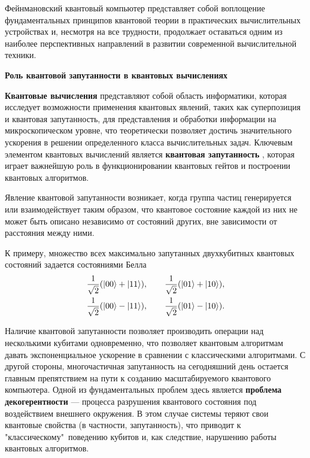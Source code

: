 Фейнмановский квантовый компьютер представляет собой воплощение фундаментальных принципов квантовой теории в практических вычислитель­ных устройствах и, несмотря на все трудности, продолжает оставаться одним из наиболее перспективных направлений в развитии современной вычислитель­ной техники.

\clearpage
\indent\textbf{Роль квантовой запутанности в квантовых вычислениях}

\textbf{Квантовые вычисления} представляют собой область информатики, которая исследует возможности применения квантовых явлений, таких как суперпозиция и квантовая запутанность, для представления и обработки ин­формации на микроскопическом уровне, что теоретически позволяет достичь значительного ускорения в решении определенного класса вычислительных задач. Ключевым элементом квантовых вычислений является \textbf{квантовая за­путанность} \cite{nielsen_chuang}, которая играет важнейшую роль в функционировании квантовых гейтов и построении квантовых алгоритмов.

Явление квантовой запутанности возникает, когда группа частиц генерируется или взаимодействует таким образом, что квантовое состояние каж­дой из них не может быть описано независимо от состояний других, вне зависимости от расстояния между ними.

К примеру, множество всех максимально запутанных двухкубитных кван­товых состояний задается состояниями Белла \cite{nielsen_chuang}
\begin{align*}
	\frac{1}{\sqrt{2}}(|00\rangle + |11\rangle),\qquad \frac{1}{\sqrt{2}}(|01\rangle + |10\rangle),\\
	\frac{1}{\sqrt{2}}(|00\rangle - |11\rangle),\qquad \frac{1}{\sqrt{2}}(|01\rangle - |10\rangle).
\end{align*}

Наличие квантовой запутанности позволяет производить операции над несколькими кубитами одновременно, что позволяет квантовым алгоритмам давать экспоненциальное ускорение в сравнении с классическими алгоритмами. С другой стороны, мно­гочастичная запутанность на сегодняшний день остается главным препятствием на пути к созданию масштабируемого квантового компьютера. Одной из фун­даментальных проблем здесь является \textbf{проблема декогерентности} \cite{decoherence_fedichkin,breuer} --- процесса разрушения квантового состояния под воздействием внешнего окружения. В этом случае системы теряют свои квантовые свойства (в частности, запутанность), что приводит к "классическому"\ поведению кубитов и, как следствие, наруше­нию работы квантовых алгоритмов.

